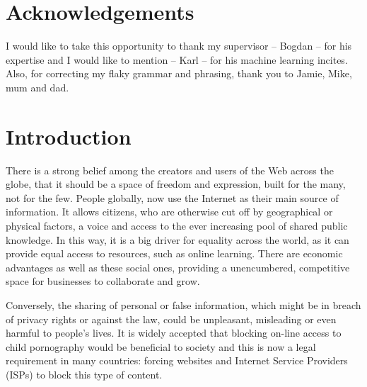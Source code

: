 \documentclass[ %
                    author={Samuel Russell},
                supervisor={Prof. Bogdan Warinschi},
                    degree={MEng},
                     title={Innocuous Ciphertexts},
                  subtitle={The DE-CENSOR Scheme},
                      type={Research},
                      year={2018} ]{dissertation}
\begin{document}

\chapter*{Acknowledgements}


I would like to take this opportunity to thank my supervisor -- Bogdan -- for his expertise and I would like to mention -- Karl -- for his machine learning incites. Also, for correcting my flaky grammar and phrasing, thank you to Jamie, Mike, mum and dad.


%

\mainmatter


\chapter{Introduction}
\label{chap:intro}

There is a strong belief among the creators and users of the Web across the globe, that it should be a space of freedom and expression, built for the many, not for the few.
People globally, now use the Internet as their main source of information.
It allows citizens, who are otherwise cut off by geographical or physical factors, a voice and access to the ever increasing pool of shared public knowledge.
In this way, it is a big driver for equality across the world, as it can provide equal access to resources, such as online learning.
There are economic advantages as well as these social ones, providing a unencumbered, competitive space for businesses to collaborate and grow.

Conversely, the sharing of personal or false information, which might be in breach of privacy rights or against the law, could be unpleasant, misleading or even harmful to people's lives.
It is widely accepted that blocking on-line access to child pornography would be beneficial to society and this is now a legal requirement in many countries: forcing websites and Internet Service Providers (ISPs) to block this type of content.
\end{document}
